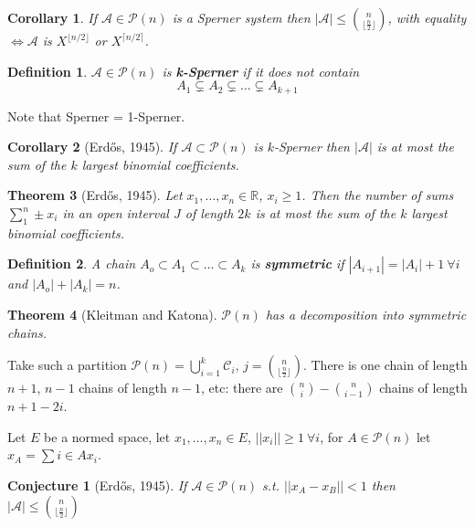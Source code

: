 \documentclass[a4paper]{article}
\newtheorem*{definition}{Definition}
\newtheorem*{conjecture}{Conjecture}
\newtheorem{theorem}{Theorem}
\newtheorem{corollary}[theorem]{Corollary}
\newcommand*\abs[1]{\left|#1\right|}
\newcommand*\norm[1]{\abs{\abs{#1}}}
\begin{document}
\begin{corollary}
	If $\mathcal{A} \in \mathcal{P}(n)$ is a Sperner system then $\abs{\mathcal{A}} \leq {n \choose {\lfloor \frac{n}{2} \rfloor}}$, with equality $\iff \mathcal{A}$ is $X^{\lfloor n/2 \rfloor}$ or $X^{\lceil n/2 \rceil}$.
\end{corollary}

\begin{definition}
	$\mathcal{A} \in \mathcal{P}(n)$ is \textbf{k-Sperner} if it does not contain $$A_1 \subsetneq A_2 \subsetneq \dots \subsetneq A_{k+1}$$
\end{definition}

Note that Sperner = 1-Sperner.

\begin{corollary}[Erd\H{o}s, 1945]
If $\mathcal{A} \subset \mathcal{P}(n)$ is $k$-Sperner then $\abs{\mathcal{A}}$ is at most the sum of the $k$ largest binomial coefficients.	
\end{corollary}

\begin{theorem}[Erd\H{o}s, 1945]
	Let $x_1, \dots, x_n \in \mathbb{R}$, $x_i \geq 1$. Then the number of sums $\sum_1^n \pm x_i$ in an open interval $J$ of length $2k$ is at most the sum of the $k$ largest binomial coefficients.
\end{theorem}

\begin{definition}
	A chain $A_o \subset A_1 \subset \dots \subset A_k$ is \textbf{symmetric} if $\abs{A_{i+1}} = \abs{A_i} + 1\ \forall i$ and $\abs{A_o} + \abs{A_k} = n$.
\end{definition}

\begin{theorem}[Kleitman and Katona]
	$\mathcal{P}(n)$ has a decomposition into symmetric chains.
\end{theorem}

Take such a partition $\mathcal{P}(n) = \bigcup_{i=1}^k \mathcal{C}_i$, $j = {n \choose {\lfloor\frac{n}{2}\rfloor}}$. There is one chain of length $n+1$, $n-1$ chains of length $n-1$, etc: there are ${n \choose i} - {n \choose {i-1}}$ chains of length $n+1-2i$.

Let $E$ be a normed space, let $x_1, \dots, x_n \in E$, $\norm{x_i} \geq 1 \ \forall i$, for $A \in \mathcal{P}(n)$ let $x_A = \sum{i \in A} x_i$.
\begin{conjecture}[Erd\H{o}s, 1945]
	If $\mathcal{A} \in \mathcal{P}(n)$ s.t. $\norm{x_A - x_B} < 1$ then $\abs{\mathcal{A}} \leq {n \choose {\lfloor\frac{n}{2}\rfloor}}$
\end{conjecture}
\end{document}
